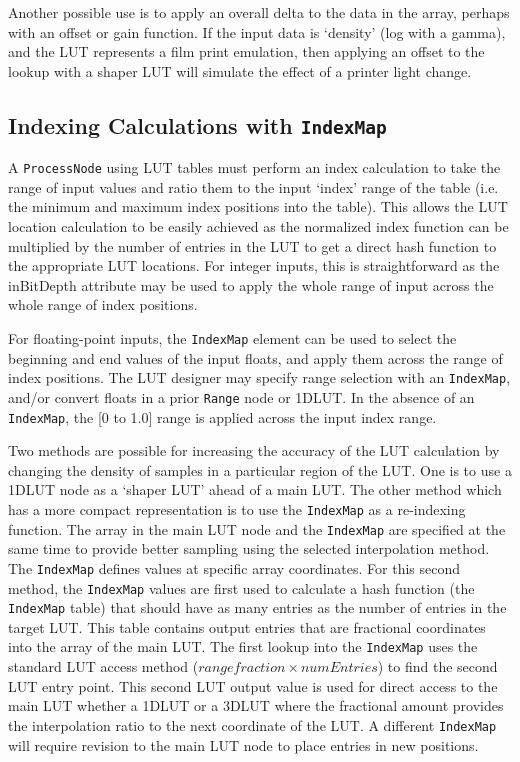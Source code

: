 Another possible use is to apply an overall delta to the data in the array, perhaps with an offset or gain function. If the input data is `density' (log with a gamma), and the LUT represents a film print emulation, then applying an offset to the lookup with a shaper LUT will simulate the effect of a printer light change.

\subsection*{Indexing Calculations with \texttt{IndexMap}}
A \texttt{ProcessNode} using LUT tables must perform an index calculation to take the range of input values and ratio them to the input `index' range of the table (i.e. the minimum and maximum index positions into the table). This allows the LUT location calculation to be easily achieved as the normalized index function can be multiplied by the number of entries in the LUT to get a direct hash function to the appropriate LUT locations. For integer inputs, this is straightforward as the inBitDepth attribute may be used to apply the whole range of input across the whole range of index positions.

For floating-point inputs, the \texttt{IndexMap} element can be used to select the beginning and end values of the input floats, and apply them across the range of index positions. The LUT designer  may specify range selection with an \texttt{IndexMap}, and/or convert floats in a prior \texttt{Range} node or 1DLUT. In the absence of an \texttt{IndexMap}, the [0 to 1.0] range is applied across the input index range.

Two methods are possible for increasing the accuracy of the LUT calculation by changing the density of samples in a particular region of the LUT. One is to use a 1DLUT node as a `shaper LUT' ahead of a main LUT. The other method which has a more compact representation is to use the \texttt{IndexMap} as a re-indexing function. The array in the main LUT node and the \texttt{IndexMap} are specified at the same time to provide better sampling using the selected interpolation method. The \texttt{IndexMap} defines values at specific array coordinates.  For this second method, the \texttt{IndexMap} values are first used to calculate a hash function (the \texttt{IndexMap} table) that should have as many entries as the number of entries in the target LUT. This table contains output entries that are fractional coordinates into the array of the main LUT. The first lookup into the \texttt{IndexMap} uses the standard LUT access method ($range fraction \times numEntries$) to find the second LUT entry point. This second LUT output value is used for direct access to the main LUT whether a 1DLUT or a 3DLUT where the fractional amount provides the interpolation ratio to the next coordinate of the LUT. A different \texttt{IndexMap} will require revision to the main LUT node to place entries in new positions.